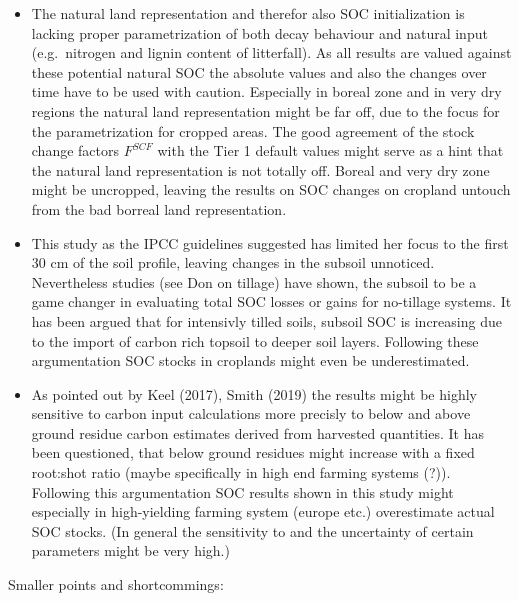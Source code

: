 \documentclass[gc, manuscript]{copernicus}
\begin{document}
\begin{itemize}
\item
  The natural land representation and therefor also SOC initialization is lacking proper parametrization of both decay behaviour and natural input (e.g.~nitrogen and lignin content of litterfall). As all results are valued against these potential natural SOC the absolute values and also the changes over time have to be used with caution. Especially in boreal zone and in very dry regions the natural land representation might be far off, due to the focus for the parametrization for cropped areas.
  The good agreement of the stock change factors \(F^{SCF}\) with the Tier 1 default values might serve as a hint that the natural land representation is not totally off. Boreal and very dry zone might be uncropped, leaving the results on SOC changes on cropland untouch from the bad borreal land representation.
\item
  This study as the IPCC guidelines suggested has limited her focus to the first 30 cm of the soil profile, leaving changes in the subsoil unnoticed. Nevertheless studies (see Don on tillage) have shown, the subsoil to be a game changer in evaluating total SOC losses or gains for no-tillage systems. It has been argued that for intensivly tilled soils, subsoil SOC is increasing due to the import of carbon rich topsoil to deeper soil layers. Following these argumentation SOC stocks in croplands might even be underestimated.
\item
  As pointed out by Keel (2017), Smith (2019) the results might be highly sensitive to carbon input calculations more precisly to below and above ground residue carbon estimates derived from harvested quantities. It has been questioned, that below ground residues might increase with a fixed root:shot ratio (maybe specifically in high end farming systems (?)). Following this argumentation SOC results shown in this study might especially in high-yielding farming system (europe etc.) overestimate actual SOC stocks. (In general the sensitivity to and the uncertainty of certain parameters might be very high.)
\end{itemize}

\newpage

Smaller points and shortcommings:
\end{document}
